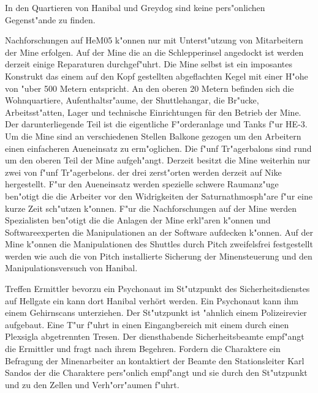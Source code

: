In den Quartieren von Hanibal und Greydog sind keine pers"onlichen Gegenst"ande zu finden.

Nachforschungen auf HeM05 k"onnen nur mit Unterst"utzung von Mitarbeitern der Mine erfolgen. Auf der Mine die an die Schlepperinsel angedockt ist werden derzeit einige Reparaturen durchgef"uhrt. Die Mine selbst ist ein imposantes Konstrukt das einem auf den Kopf gestellten abgeflachten Kegel mit einer H"ohe von "uber 500 Metern entspricht. An den oberen 20 Metern befinden sich die Wohnquartiere, Aufenthaltsr"aume, der Shuttlehangar, die Br"ucke, Arbeitsst"atten, Lager und technische Einrichtungen für den Betrieb der Mine. Der darunterliegende Teil ist die eigentliche F"orderanlage und Tanks f"ur HE-3. Um die Mine sind an verschiedenen Stellen Balkone gezogen um den Arbeitern einen einfacheren Au\3eneinsatz zu erm"oglichen. Die f"unf Tr"agerbalons sind rund um den oberen Teil der Mine aufgeh"angt. 
Derzeit besitzt die Mine weiterhin nur zwei von f"unf Tr"agerbelons. der drei zerst"orten werden derzeit auf Nike hergestellt. F"ur den Au\3eneinsatz werden spezielle schwere Raumanz"uge ben"otigt die die Arbeiter vor den Widrigkeiten der Saturnathmosph"are f"ur eine kurze Zeit sch"utzen k"onnen. F"ur die Nachforschungen auf der Mine werden Spezialisten ben"otigt die die Anlagen der Mine erkl"aren k"onnen und Softwareexperten die Manipulationen an der Software aufdecken k"onnen. Auf der Mine k"onnen die Manipulationen des Shuttles durch Pitch zweifelsfrei festgestellt werden wie auch die von Pitch installierte Sicherung der Minensteuerung und den Manipulationsversuch von Hanibal.


Treffen Ermittler bevorzu ein Psychonaut im St"utzpunkt des Sicherheitsdienstes auf Hellgate ein kann dort Hanibal verhört werden. Ein Psychonaut kann ihm einem Gehirnscans unterziehen. Der St"utzpunkt ist "ahnlich einem Polizeirevier aufgebaut. Eine T"ur f"uhrt in einen Eingangbereich mit einem durch einen Plexsigla\3 abgetrennten Tresen. Der diensthabende Sicherheitsbeamte empf"angt die Ermittler und fragt nach ihrem Begehren. Fordern die Charaktere ein Befragung der Minenarbeiter an kontaktiert der Beamte den Stationsleiter Karl Sandos der die Charaktere pers"onlich empf"angt und sie durch den St"utzpunkt und zu den Zellen und Verh"orr"aumen f"uhrt.

